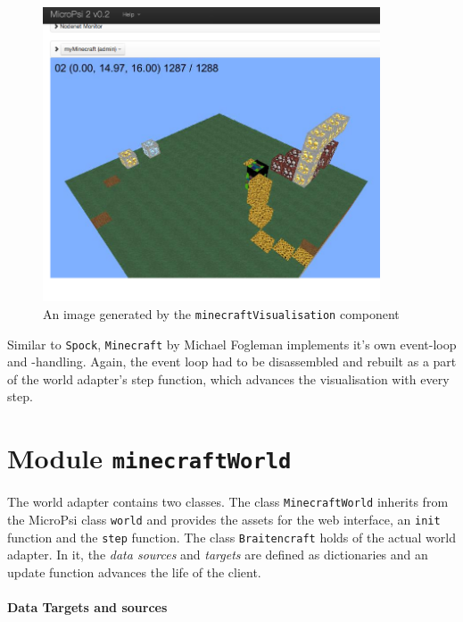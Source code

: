 \begin{figure}[h]
  \centering
    \includegraphics[width=10cm]{graphics/visualisation_screen}
  \caption{An image generated by the \texttt{minecraftVisualisation} component}
  \label{vis_screen}
\end{figure}



Similar to \texttt{Spock}, \texttt{Minecraft} by Michael Fogleman implements it's own event-loop and -handling. Again, the event loop had to be disassembled and rebuilt as a part of the world adapter's step function, which advances the visualisation with every step.

    \section{Module \texttt{minecraftWorld}}

    
The world adapter contains two classes. The class \texttt{MinecraftWorld} inherits from the MicroPsi class \texttt{world} and provides the assets for the web interface, an \texttt{init} function and the \texttt{step} function. The class \texttt{Braitencraft} holds of the actual world adapter. In it, the \emph{data sources} and \emph{targets} are defined as dictionaries and an update function advances the life of the client.
    
\paragraph{Data Targets and sources}$\;$ \\

